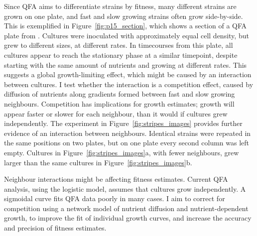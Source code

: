 Since QFA aims to differentiate strains by fitness, many different
strains are grown on one plate, and fast and slow growing strains
often grow side-by-side. This is exemplified in
Figure~\ref{fig:p15_section}, which shows a section of a QFA plate
from \citet{Addinall2011}. Cultures were inoculated with approximately
equal cell density, but grew to different sizes, at different
rates. In timecourses from this plate, all cultures appear to reach
the stationary phase at a similar timepoint, despite starting with the
same amount of nutrients and growing at different rates. This suggests
a global growth-limiting effect, which might be caused by an
interaction between cultures. I test whether the interaction is a
competition effect, caused by diffusion of nutrients along gradients
formed between fast and slow growing neighbours. Competition has
implications for growth estimates; growth will appear faster or slower
for each neighbour, than it would if cultures grew independently. The
experiment in Figure~\ref{fig:stripes_images} provides further
evidence of an interaction between neighbours. Identical strains were
repeated in the same positions on two plates, but on one plate every
second column was left empty. Cultures in
Figure~\ref{fig:stripes_images}a, with fewer neighbours, grew larger
than the same cultures in Figure~\ref{fig:stripes_images}b.

Neighbour interactions might be affecting fitness estimates. Current
QFA analysis, using the logistic model, assumes that cultures grow
independently. A sigmoidal curve fits QFA data poorly in many cases.
I aim to correct for competition using a network model of nutrient
diffusion and nutrient-dependent growth, to improve the fit of
individual growth curves, and increase the accuracy and precision of
fitness estimates.

